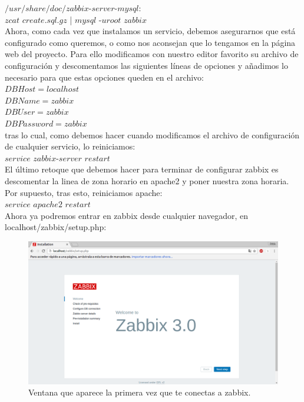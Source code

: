 \begin{itemize}
	$/usr/share/doc/zabbix$-$server$-$mysql$:\\
	$zcat$ $create.sql.gz$ | $mysql$ -$uroot$ $zabbix$\\
	
	Ahora, como cada vez que instalamos un servicio, debemos asegurarnos que está configurado como queremos, o como nos aconsejan que lo tengamos en la página web del proyecto. Para ello modificamos con nuestro editor favorito su archivo de configuración y descomentamos las siguientes líneas de opciones y añadimos lo necesario para que estas opciones queden en el archivo:\\

	$DBHost=localhost$\\
	$DBName=zabbix$\\
	$DBUser=zabbix$\\
	$DBPassword=zabbix$\\
	
	tras lo cual, como debemos hacer cuando modificamos el archivo de configuración de cualquier servicio, lo reiniciamos:\\
	
	$service$ $zabbix$-$server$ $restart$\\
	
	El último retoque que debemos hacer para terminar de configurar zabbix es descomentar la linea de zona horario en apache2 y poner nuestra zona horaria. Por supuesto, tras esto, reiniciamos apache:\\
	
	$service$ $apache2$ $restart$\\
	
	Ahora ya podremos entrar en zabbix desde cualquier navegador, en localhost/zabbix/setup.php:\\
	
	\begin{figure}[H]
	\centering
	\includegraphics[width=0.7\linewidth]{zabbix1}
	\caption[Inicio de zabbix]{Ventana que aparece la primera vez que te conectas a zabbix.}
	\label{fig:zabbix1}
	\end{figure}
	

\end{itemize}
